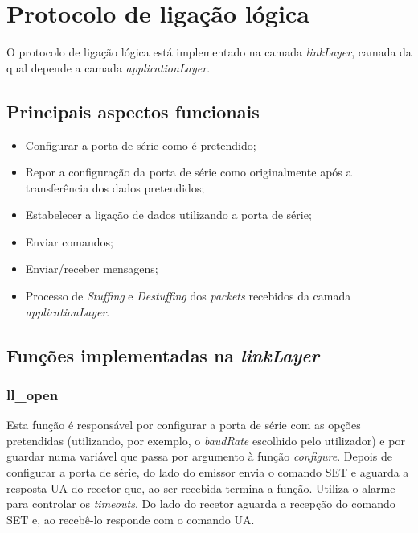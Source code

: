 \documentclass[11pt]{article}
\begin{document}

\newpage
\section{Protocolo de ligação lógica}

O protocolo de ligação lógica está implementado na camada \textit{linkLayer}, camada da qual depende a camada \textit{applicationLayer}.

\subsection{Principais aspectos funcionais}
\begin{itemize}
  \item Configurar a porta de série como é pretendido;
  \item Repor a configuração da porta de série como originalmente após a transferência dos dados pretendidos;
  \item  Estabelecer a ligação de dados utilizando a porta de série;
  \item  Enviar comandos;
  \item  Enviar/receber mensagens;
  \item Processo de \textit{Stuffing} e \textit{Destuffing} dos \textit{packets} recebidos da camada \textit{applicationLayer}.
\end{itemize}


\subsection{Funções implementadas na \textit{linkLayer}}
  
 \subsubsection{ll\_open}

	Esta função é responsável por configurar a porta de série com as opções pretendidas (utilizando, por exemplo, o \textit{baudRate} escolhido pelo utilizador) e por guardar numa variável que passa por argumento à função \textit{configure}.
	Depois de configurar a porta de série, do lado do emissor envia o comando SET e aguarda a resposta UA do recetor que, ao ser recebida termina a função. Utiliza o alarme para controlar os \textit{timeouts}. Do lado do recetor aguarda a recepção do comando SET e, ao recebê-lo responde com o comando UA.
   	
\end{document}
